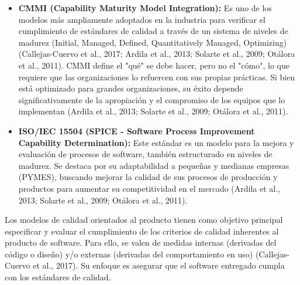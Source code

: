 \documentclass[11pt]{article}
\begin{document}
\begin{itemize}
    \item \textbf{CMMI (Capability Maturity Model Integration):} Es uno de los modelos más ampliamente adoptados en la industria para verificar el cumplimiento de estándares de calidad a través de un sistema de niveles de madurez (Initial, Managed, Defined, Quantitatively Managed, Optimizing) (Callejas-Cuervo et al., 2017; Ardila et al., 2013; Solarte et al., 2009; Otálora et al., 2011). CMMI define el "qué" se debe hacer, pero no el "cómo", lo que requiere que las organizaciones lo refuercen con sus propias prácticas. Si bien está optimizado para grandes organizaciones, su éxito depende significativamente de la apropiación y el compromiso de los equipos que lo implementan (Ardila et al., 2013; Solarte et al., 2009; Otálora et al., 2011).
    \item \textbf{ISO/IEC 15504 (SPICE - Software Process Improvement Capability Determination):} Este estándar es un modelo para la mejora y evaluación de procesos de software, también estructurado en niveles de madurez. Se destaca por su adaptabilidad a pequeñas y medianas empresas (PYMES), buscando mejorar la calidad de sus procesos de producción y productos para aumentar su competitividad en el mercado (Ardila et al., 2013; Solarte et al., 2009; Otálora et al., 2011).
\end{itemize}

Los modelos de calidad orientados al producto tienen como objetivo principal especificar y evaluar el cumplimiento de los criterios de calidad inherentes al producto de software. Para ello, se valen de medidas internas (derivadas del código o diseño) y/o externas (derivadas del comportamiento en uso) (Callejas-Cuervo et al., 2017). Su enfoque es asegurar que el software entregado cumpla con los estándares de calidad.
\end{document}
